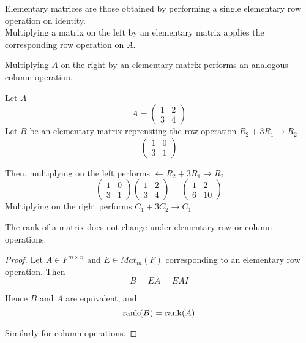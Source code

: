 \begin{remark}
    Elementary matrices are those obtained by performing a single elementary row operation on identity. \\

    Multiplying a matrix on the left by an elementary matrix applies the corresponding row operation on $A$. 
\end{remark}

\begin{remark}
    Multiplying $A$ on the right by an elementary matrix performs an analogous column operation.
\end{remark}

\begin{example}
    Let $A$
    \[
        A = \begin{pmatrix} 
          1 & 2 \\ 3 & 4  
        \end{pmatrix}
    \]
    Let $B$ be an elementary matrix reprensting the row operation $R_2 + 3R_1 \to R_2$
    \[
        \begin{pmatrix} 
          1 & 0 \\ 3 & 1  
        \end{pmatrix}
    \]

    Then,  multiplying on the left performs $\leftarrow R_2 + 3 R_1 \to R_2$
    \[
        \begin{pmatrix} 
          1 & 0 \\ 3 & 1  
        \end{pmatrix} \begin{pmatrix} 
          1 & 2 \\ 3 & 4  
        \end{pmatrix} = \begin{pmatrix} 
          1 & 2 \\ 6 & 10  
        \end{pmatrix}
    \]
    Multiplying on the right performs $C_1 + 3 C_2 \to C_1$
\end{example}

\begin{proposition}
    The rank of a matrix does not change under elementary row or column operations.
\end{proposition}

\begin{proof}
    Let $A \in F^{m \times n}$ and $E \in Mat_m(F)$ corresponding to an elementary row operation. Then 
    \[
        B = EA = EA I
    \]

    Hence $B$ and $A$ are equivalent, and 
    \[
        \rank(B) = \rank(A)
    \]

    Similarly for column operations.
\end{proof}

